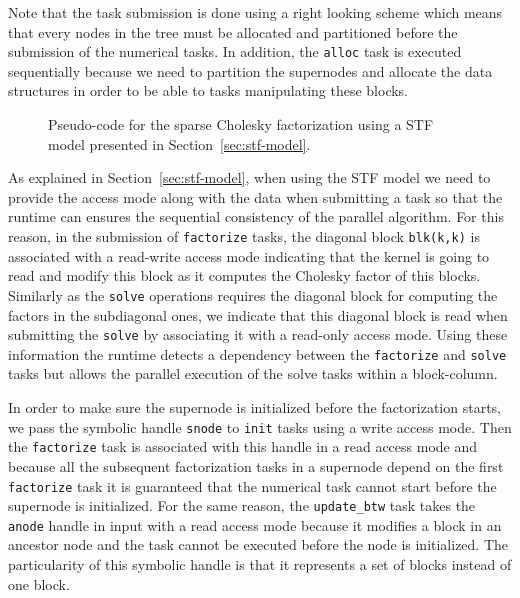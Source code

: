 \documentclass{article}
\begin{document}
Note that the task submission is done using a right looking scheme
which means that every nodes in the tree must be allocated and
partitioned before the submission of the numerical tasks. In addition,
the \texttt{alloc} task is executed sequentially because we need to
partition the supernodes and allocate the data structures in order to
be able to tasks manipulating these blocks.

\begin{figure}[!h]
  \centering 
\caption{\label{fig:spllt-facto-pseudocode}Pseudo-code for the sparse
  Cholesky factorization using a STF model presented in
  Section~\ref{sec:stf-model}.}
\end{figure}

As explained in Section~\ref{sec:stf-model}, when using the STF model
we need to provide the access mode along with the data when submitting
a task so that the runtime can ensures the sequential consistency of
the parallel algorithm. For this reason, in the submission of
\texttt{factorize} tasks, the diagonal block \texttt{blk(k,k)} is
associated with a read-write access mode indicating that the kernel is
going to read and modify this block as it computes the Cholesky factor
of this blocks. Similarly as the \texttt{solve} operations requires
the diagonal block for computing the factors in the subdiagonal ones,
we indicate that this diagonal block is read when submitting the
\texttt{solve} by associating it with a read-only access mode. Using
these information the runtime detects a dependency between the
\texttt{factorize} and \texttt{solve} tasks but allows the parallel
execution of the solve tasks within a block-column. 

In order to make sure the supernode is initialized before the
factorization starts, we pass the symbolic handle \texttt{snode} to
\texttt{init} tasks using a write access mode. Then the
\texttt{factorize} task is associated with this handle in a read
access mode and because all the subsequent factorization tasks in a
supernode depend on the first \texttt{factorize} task it is guaranteed
that the numerical task cannot start before the supernode is
initialized. For the same reason, the \texttt{update\_btw} task takes
the \texttt{anode} handle in input with a read access mode because it
modifies a block in an ancestor node and the task cannot be executed
before the node is initialized. The particularity of this symbolic
handle is that it represents a set of blocks instead of one block.
\end{document}
